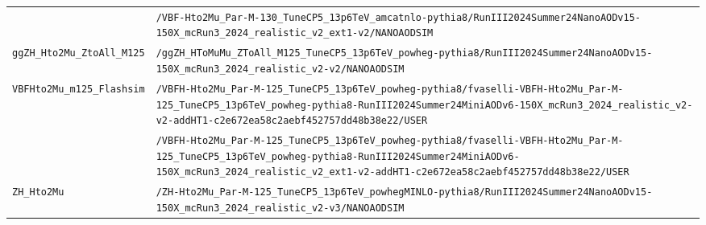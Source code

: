 \begin{longtable}{@{}>{\RaggedRight\arraybackslash}p{} >{\RaggedRight\arraybackslash}p{}@{}}
 & \texttt{/\allowbreak{}VBF-\allowbreak{}Hto2Mu\_\allowbreak{}Par-\allowbreak{}M-\allowbreak{}130\_\allowbreak{}TuneCP5\_\allowbreak{}13p6TeV\_\allowbreak{}amcatnlo-\allowbreak{}pythia8/\allowbreak{}RunIII2024Summer24NanoAODv15-\allowbreak{}150X\_\allowbreak{}mcRun3\_\allowbreak{}2024\_\allowbreak{}realistic\_\allowbreak{}v2\_\allowbreak{}ext1-\allowbreak{}v2/\allowbreak{}NANOAODSIM} \\
\addlinespace[2pt]
\texttt{ggZH\_\allowbreak{}Hto2Mu\_\allowbreak{}ZtoAll\_\allowbreak{}M125} & \texttt{/\allowbreak{}ggZH\_\allowbreak{}HToMuMu\_\allowbreak{}ZToAll\_\allowbreak{}M125\_\allowbreak{}TuneCP5\_\allowbreak{}13p6TeV\_\allowbreak{}powheg-\allowbreak{}pythia8/\allowbreak{}RunIII2024Summer24NanoAODv15-\allowbreak{}150X\_\allowbreak{}mcRun3\_\allowbreak{}2024\_\allowbreak{}realistic\_\allowbreak{}v2-\allowbreak{}v2/\allowbreak{}NANOAODSIM} \\
\addlinespace[2pt]
\texttt{VBFHto2Mu\_\allowbreak{}m125\_\allowbreak{}Flashsim} & \texttt{/\allowbreak{}VBFH-\allowbreak{}Hto2Mu\_\allowbreak{}Par-\allowbreak{}M-\allowbreak{}125\_\allowbreak{}TuneCP5\_\allowbreak{}13p6TeV\_\allowbreak{}powheg-\allowbreak{}pythia8/\allowbreak{}fvaselli-\allowbreak{}VBFH-\allowbreak{}Hto2Mu\_\allowbreak{}Par-\allowbreak{}M-\allowbreak{}125\_\allowbreak{}TuneCP5\_\allowbreak{}13p6TeV\_\allowbreak{}powheg-\allowbreak{}pythia8-\allowbreak{}RunIII2024Summer24MiniAODv6-\allowbreak{}150X\_\allowbreak{}mcRun3\_\allowbreak{}2024\_\allowbreak{}realistic\_\allowbreak{}v2-\allowbreak{}v2-\allowbreak{}addHT1-\allowbreak{}c2e672ea58c2aebf452757dd48b38e22/\allowbreak{}USER} \\
 & \texttt{/\allowbreak{}VBFH-\allowbreak{}Hto2Mu\_\allowbreak{}Par-\allowbreak{}M-\allowbreak{}125\_\allowbreak{}TuneCP5\_\allowbreak{}13p6TeV\_\allowbreak{}powheg-\allowbreak{}pythia8/\allowbreak{}fvaselli-\allowbreak{}VBFH-\allowbreak{}Hto2Mu\_\allowbreak{}Par-\allowbreak{}M-\allowbreak{}125\_\allowbreak{}TuneCP5\_\allowbreak{}13p6TeV\_\allowbreak{}powheg-\allowbreak{}pythia8-\allowbreak{}RunIII2024Summer24MiniAODv6-\allowbreak{}150X\_\allowbreak{}mcRun3\_\allowbreak{}2024\_\allowbreak{}realistic\_\allowbreak{}v2\_\allowbreak{}ext1-\allowbreak{}v2-\allowbreak{}addHT1-\allowbreak{}c2e672ea58c2aebf452757dd48b38e22/\allowbreak{}USER} \\
\addlinespace[2pt]
\texttt{ZH\_\allowbreak{}Hto2Mu} & \texttt{/\allowbreak{}ZH-\allowbreak{}Hto2Mu\_\allowbreak{}Par-\allowbreak{}M-\allowbreak{}125\_\allowbreak{}TuneCP5\_\allowbreak{}13p6TeV\_\allowbreak{}powhegMINLO-\allowbreak{}pythia8/\allowbreak{}RunIII2024Summer24NanoAODv15-\allowbreak{}150X\_\allowbreak{}mcRun3\_\allowbreak{}2024\_\allowbreak{}realistic\_\allowbreak{}v2-\allowbreak{}v3/\allowbreak{}NANOAODSIM} \\

\end{longtable}
